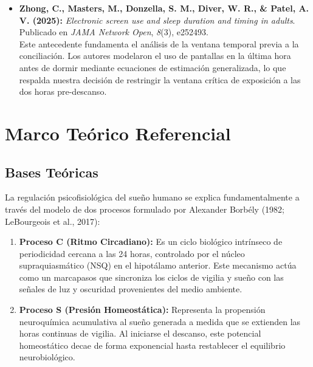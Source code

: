 \documentclass[12pt, letterpaper]{article}
\begin{document}
\begin{itemize}
    \item \textbf{Zhong, C., Masters, M., Donzella, S. M., Diver, W. R., \& Patel, A. V. (2025):} \textit{Electronic screen use and sleep duration and timing in adults}. Publicado en \textit{JAMA Network Open}, \textit{8}(3), e252493.\\
    Este antecedente fundamenta el análisis de la ventana temporal previa a la conciliación. Los autores modelaron el uso de pantallas en la última hora antes de dormir mediante ecuaciones de estimación generalizada, lo que respalda nuestra decisión de restringir la ventana crítica de exposición a las dos horas pre-descanso.
\end{itemize}


\section{Marco Teórico Referencial}

\subsection{Bases Teóricas}

La regulación psicofisiológica del sueño humano se explica fundamentalmente a través del modelo de dos procesos formulado por Alexander Borbély (1982; LeBourgeois et al., 2017):

\begin{enumerate}
    \item \textbf{Proceso C (Ritmo Circadiano):} Es un ciclo biológico intrínseco de periodicidad cercana a las 24 horas, controlado por el núcleo supraquiasmático (NSQ) en el hipotálamo anterior. Este mecanismo actúa como un marcapasos que sincroniza los ciclos de vigilia y sueño con las señales de luz y oscuridad provenientes del medio ambiente.
    \item \textbf{Proceso S (Presión Homeostática):} Representa la propensión neuroquímica acumulativa al sueño generada a medida que se extienden las horas continuas de vigilia. Al iniciarse el descanso, este potencial homeostático decae de forma exponencial hasta restablecer el equilibrio neurobiológico.
\end{enumerate}
\end{document}
